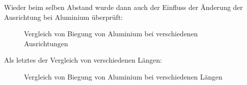 \documentclass[11pt,a4paper]{article}
\begin{document}
\pagebreak

Wieder beim selben Abstand wurde dann auch der Einfluss der \"Anderung der Ausrichtung bei Aluminium \"uberpr\"uft:

\begin{figure}[h]
\centering
{}
\renewcommand\thefigure{1}
\caption[Vergleich von Biegung von Aluminium bei verschiedenen Ausrichtungen]{Vergleich von Biegung von Aluminium bei verschiedenen Ausrichtungen}
\label{Abb:X}
\end{figure}
\pagebreak

Als letztes der Vergleich von verschiedenen L\"angen:

\begin{figure}[h]
\centering
{}
\renewcommand\thefigure{1}
\caption[Vergleich von Biegung von Aluminium bei verschiedenen L\"angen]{Vergleich von Biegung von Aluminium bei verschiedenen L\"angen}
\label{Abb:X}
\end{figure}
\end{document}
